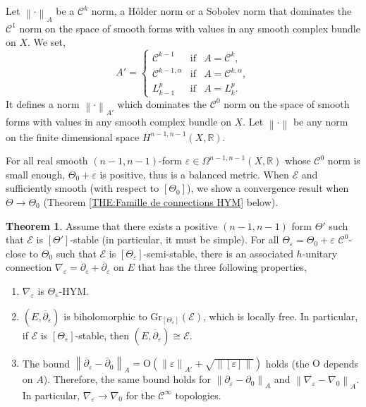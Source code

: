 \documentclass{article}
\theoremstyle{remark}
\theoremstyle{definition}
\newtheorem{theoremIntro}{Theorem}
\newcommand{\R}{\mathbb{R}}
\newcommand{\norme}[1]{\left\| #1 \right\|}
\newcommand{\E}{\mathcal{E}}
\newcommand{\Gr}{\mathrm{Gr}}
\newcommand{\dbar}{\overline{\partial}}
\newcommand{\mC}{\mathcal{C}}
\begin{document}
Let $\norme{\cdot}_A$ be a $\mC^k$ norm, a Hölder norm or a Sobolev norm that dominates the $\mC^1$ norm on the space of smooth forms with values in any smooth complex bundle on $X$. We set,
$$
A' = \left\{
\begin{array}{lcl}
    \mC^{k - 1} & \textrm{if} & A = \mC^k,\\
    \mC^{k - 1,\alpha} & \textrm{if} & A = \mC^{k,\alpha},\\
    L_{k - 1}^p & \textrm{if} & A = L_k^p.
\end{array}
\right.
$$
It defines a norm $\norme{\cdot}_{A'}$ which dominates the $\mC^0$ norm on the space of smooth forms with values in any smooth complex bundle on $X$. Let $\norme{\cdot}$ be any norm on the finite dimensional space $H^{n - 1,n - 1}(X,\R)$.

For all real smooth $(n - 1,n - 1)$-form $\varepsilon \in \Omega^{n - 1,n - 1}(X,\R)$ whose $\mC^0$ norm is small enough, $\Theta_0 + \varepsilon$ is positive, thus is a balanced metric. When $\E$ and sufficiently smooth (with respect to $[\Theta_0]$), we show a convergence result when $\Theta \rightarrow \Theta_0$ (Theorem \ref{THE:Famille de connections HYM} below).

\begin{theoremIntro}\label{THE:3}
    Assume that there exists a positive $(n - 1,n - 1)$ form $\Theta'$ such that $\E$ is $[\Theta']$-stable (in particular, it must be simple). For all $\Theta_\varepsilon = \Theta_0 + \varepsilon$ $\mC^0$-close to $\Theta_0$ such that $\E$ is $[\Theta_\varepsilon]$-semi-stable, there is an associated $h$-unitary connection $\nabla_\varepsilon = \partial_\varepsilon + \dbar_\varepsilon$ on $E$ that has the three following properties,
    \begin{enumerate}
        \item $\nabla_\varepsilon$ is $\Theta_\varepsilon$-HYM.
        \item $(E,\dbar_\varepsilon)$ is biholomorphic to $\Gr_{[\Theta_\varepsilon]}(\E)$, which is locally free. In particular, if $\E$ is $[\Theta_\varepsilon]$-stable, then $(E,\dbar_\varepsilon) \cong \E$.
        \item The bound $\norme{\dbar_\varepsilon - \dbar_0}_A = \mathrm{O}\!\left(\norme{\varepsilon}_{A'} + \sqrt{\norme{[\varepsilon]}}\right)$ holds (the $\mathrm{O}$ depends on $A$). Therefore, the same bound holds for $\norme{\partial_\varepsilon - \partial_0}_A$ and $\norme{\nabla_\varepsilon - \nabla_0}_A$. In particular, $\nabla_\varepsilon \rightarrow \nabla_0$ for the $\mC^\infty$ topologies.
    \end{enumerate}
\end{theoremIntro}
\end{document}
